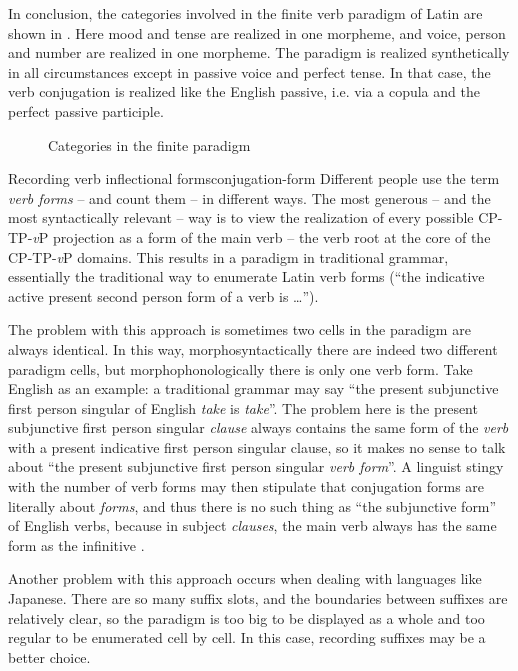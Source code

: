 \documentclass[a4paper, oneside]{report}
\newcommand*{\citepage}[1]{p.~{#1}}
\newcommand*{\term}[1]{\emph{#1}}
\newcommand{\corpus}[1]{\emph{#1}}
\newcommand{\vP}{\textit{v}P}
\begin{document}
In conclusion, the categories involved in the finite verb paradigm of Latin 
are shown in .
Here mood and tense are realized in one morpheme,
and voice, person and number are realized in one morpheme.
The paradigm is realized synthetically in all circumstances 
except in passive voice and perfect tense.
In that case, the verb conjugation is realized like the English passive,
i.e. via a copula and the perfect passive participle.

\begin{figure}[H]
    \centering
    
    \caption{Categories in the finite paradigm}
    \label{fig:paradigm-finite-verb}
\end{figure}

\begin{infobox}{Recording verb inflectional forms}{conjugation-form}
    Different people use the term \term{verb forms} -- and count them -- in different ways.
    The most generous -- and the most syntactically relevant -- way 
    is to view the realization of every possible CP-TP-\vP{} projection 
    as a form of the main verb -- the verb root at the core of the CP-TP-\vP{} domains.
    This results in a paradigm in traditional grammar, 
    essentially the traditional way to enumerate Latin verb forms 
    (``the indicative active present second person form of a verb is \dots'').

    The problem with this approach is sometimes two cells in the paradigm are always identical.
    In this way, morphosyntactically there are indeed two different paradigm cells,
    but morphophonologically there is only one verb form.
    Take English as an example: 
    a traditional grammar may say 
    ``the present subjunctive first person singular of English \corpus{take} is \corpus{take}''. 
    The problem here is the present subjunctive first person singular \emph{clause}
    always contains the same form of the \emph{verb}
    with a present indicative first person singular clause,
    so it makes no sense to talk about ``the present subjunctive first person singular \emph{verb form}''.
    A linguist stingy with the number of verb forms 
    may then stipulate that conjugation forms are literally about \emph{forms},
    and thus there is no such thing as ``the subjunctive form'' of English verbs,
    because in subject \emph{clauses}, 
    the main verb always has the same form as the infinitive
    \citep[\citepage{76}]{cgel}.

    Another problem with this approach occurs 
    when dealing with languages like Japanese.
    There are so many suffix slots,
    and the boundaries between suffixes are relatively clear,
    so the paradigm is too big to be displayed as a whole
    and too regular to be enumerated cell by cell.
    In this case, recording suffixes may be a better choice.


\end{infobox}
\end{document}

